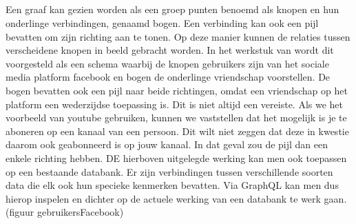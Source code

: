\subsection{}%
\label{sec:graaf}
Een graaf kan gezien worden als een groep punten benoemd als knopen en hun onderlinge verbindingen, genaamd bogen. Een verbinding kan ook een pijl bevatten om zijn richting aan te tonen. Op deze manier kunnen de relaties tussen verscheidene knopen in beeld gebracht worden. In het werkstuk van \textcite{Brysbaert2021} wordt dit voorgesteld als een schema waarbij de knopen gebruikers zijn van het sociale media platform facebook en bogen de onderlinge vriendschap voorstellen. De bogen bevatten ook een pijl naar beide richtingen, omdat een vriendschap op het platform een wederzijdse toepassing is. Dit is niet altijd een vereiste. Als we het voorbeeld van youtube gebruiken, kunnen we vaststellen dat het mogelijk is je te aboneren op een kanaal van een persoon. Dit wilt niet zeggen dat deze in kwestie daarom ook geabonneerd is op jouw kanaal. In dat geval zou de pijl dan een enkele richting hebben.
DE hierboven uitgelegde werking kan men ook toepassen op een bestaande databank. Er zijn verbindingen tussen verschillende soorten data die elk ook hun specieke kenmerken bevatten. Via GraphQL kan men dus hierop inspelen en dichter op de actuele werking van een databank te werk gaan.
(figuur gebruikersFacebook)

\subsection{}%
\label{sec:Uitvoering}


\subsection{}%
\label{sec:Gebruikservaring}


\subsection{}%
\label{sec:Architectuur}


\subsection{}%
\label{sec:API}